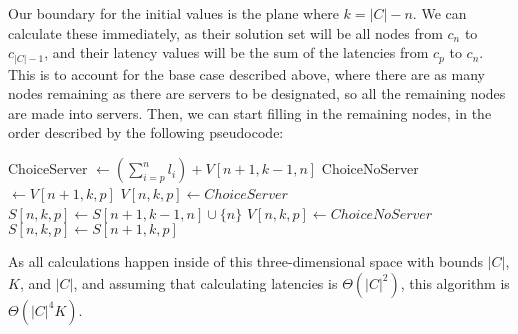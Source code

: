 \documentclass[11pt]{article}
\begin{document}
Our boundary for the initial values is the plane where $k = |C| - n$. We can calculate these immediately, as their solution set will be all nodes from $c_n$ to $c_{|C| - 1}$, and their latency values will be the sum of the latencies from $c_p$ to $c_n$. This is to account for the base case described above, where there are as many nodes remaining as there are servers to be designated, so all the remaining nodes are made into servers. Then, we can start filling in the remaining nodes, in the order described by the following pseudocode:

\pagebreak
\begin{algorithmic}
                \State ChoiceServer $\gets (\sum_{i=p}^n l_i) + V[n+1,k-1,n]$
                \State ChoiceNoServer $\gets V[n+1,k,p]$
                    \State $V[n,k,p] \gets ChoiceServer$
                    \State $S[n,k,p] \gets S[n+1, k-1, n] \cup \{n\}$
                \Else
                    \State $V[n,k,p] \gets ChoiceNoServer$
                    \State $S[n,k,p] \gets S[n+1, k, p]$
                \EndIf
            \EndFor
        \EndFor
    \EndFor
\end{algorithmic}

As all calculations happen inside of this three-dimensional space with bounds $|C|$, $K$, and $|C|$, and assuming that calculating latencies is $\Theta(|C|^2)$, this algorithm is $\Theta(|C|^4K)$.
\end{document}
